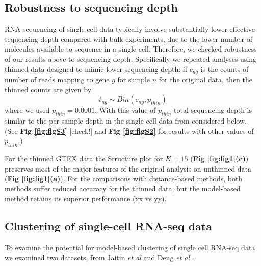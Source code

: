 \subsection{Robustness to sequencing depth}

RNA-sequencing of single-cell data typically involve substantially lower effective sequencing depth compared with bulk experiments, due to the lower number of molecules available to sequence in a single cell.
Therefore, we checked robustness of our results above to sequencing depth. Specifically we repeated analyses using thinned data designed to mimic lower sequencing depth: if $c_{ng}$ is the counts of number of reads mapping to gene $g$ for sample $n$ for the original data, then the thinned counts are given by 
\begin{equation}
t_{ng} \sim Bin (c_{ng}, p_{thin})
\end{equation}
where we used $p_{thin} =0.0001$. With this value of $p_{thin}$ total sequencing depth is similar to the per-sample depth in the 
single-cell data from \cite{Jaitin2014} considered below. (See  \textbf{Fig \ref{fig:figS3}} [check!] and \textbf{Fig \ref{fig:figS2}} for results with other values of $p_{thin}$.) 

For the thinned GTEX data the Structure plot for $K=15$ (\textbf{Fig \ref{fig:fig1}(c)}) preserves most of the major features of the original analysis on unthinned data (\textbf{Fig \ref{fig:fig1}(a)}). For the comparisons with distance-based methods, both methods suffer reduced accuracy for the thinned data, but the model-based method retains its superior performance (xx vs yy).  



\subsection{Clustering of single-cell RNA-seq data}

To examine the potential for model-based clustering of single cell RNA-seq data we examined two datasets, from Jaitin \textit{et al} \cite{Jaitin2014} and Deng \textit{et al} \cite{Deng2014}.  

